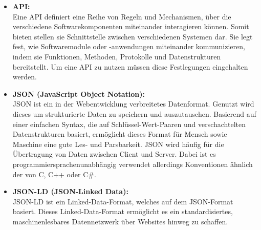 \begin{itemize}
    \item \textbf{\ac{API}:} \\
    Eine \ac{API} definiert eine Reihe von Regeln und Mechanismen, über die verschiedene Softwarekomponenten miteinander interagieren können.
    Somit bieten stellen sie Schnittstelle zwischen verschiedenen Systemen dar.
    Sie legt fest, wie Softwaremodule oder -anwendungen miteinander kommunizieren, indem sie Funktionen, Methoden, Protokolle und Datenstrukturen bereitstellt.
    Um eine \ac{API} zu nutzen müssen diese Festlegungen eingehalten werden.
    
    
    \item \textbf{JSON (JavaScript Object Notation):} \\
    JSON ist ein in der Webentwicklung verbreitetes Datenformat.
    Genutzt wird dieses um strukturierte Daten zu speichern und auszutauschen.
    Basierend auf einer einfachen Syntax, die auf Schlüssel-Wert-Paaren und verschachtelten Datenstrukturen basiert, ermöglicht dieses Format für Mensch sowie Maschine eine gute Les- und Parsbarkeit.
    JSON wird häufig für die Übertragung von Daten zwischen Client und Server.
    Dabei ist es programmiersprachenunabhängig verwendet allerdings Konventionen ähnlich der von C, C++ oder C\#.

    \item \textbf{JSON-LD (JSON-Linked Data):} \\
    JSON-LD ist ein Linked-Data-Format, welches auf dem JSON-Format basiert.
    Dieses Linked-Data-Format ermöglicht es ein standardisiertes, maschinenlesbares Datennetzwerk über Websites hinweg zu schaffen.
\end{itemize}